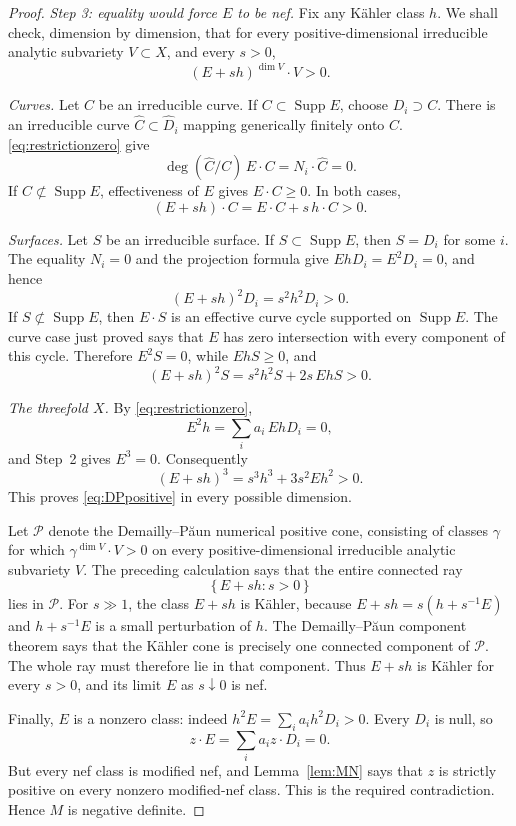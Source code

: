 \documentclass[reqno]{amsart}
\theoremstyle{remark}
\theoremstyle{plain}
\begin{document}
\begin{proof}
\smallskip
\noindent\emph{Step 3: equality would force $E$ to be nef.}
Fix any K\"ahler class $h$.  We shall check, dimension by dimension,
that for every positive-dimensional irreducible analytic subvariety
$V\subset X$, and every $s>0$,
\begin{equation}\label{eq:DPpositive}
 (E+sh)^{\dim V}\cdot V>0.
\end{equation}

\emph{Curves.}
Let $C$ be an irreducible curve.  If
$C\subset\operatorname{Supp}E$, choose $D_i\supset C$.  There is an
irreducible curve $\widehat C\subset\widehat D_i$ mapping generically
finitely onto $C$.  
\eqref{eq:restrictionzero} give
\[
 \deg(\widehat C/C)\,E\cdot C=N_i\cdot\widehat C=0.
\]
If $C\not\subset\operatorname{Supp}E$, effectiveness of $E$ gives
$E\cdot C\geq0$.  In both cases,
\[
 (E+sh)\cdot C=E\cdot C+s\,h\cdot C>0.
\]

\emph{Surfaces.}
Let $S$ be an irreducible surface.  If
$S\subset\operatorname{Supp}E$, then $S=D_i$ for some $i$.
The equality $N_i=0$ and the projection formula give
$EhD_i=E^2D_i=0$, and hence
\[
 (E+sh)^2D_i=s^2h^2D_i>0.
\]
If $S\not\subset\operatorname{Supp}E$, then $E\cdot S$ is an
effective curve cycle supported on $\operatorname{Supp}E$.  The curve
case just proved says that $E$ has zero intersection with every
component of this cycle.  Therefore
$E^2S=0$, while $EhS\geq0$, and
\[
 (E+sh)^2S=s^2h^2S+2s\,EhS>0.
\]

\emph{The threefold $X$.}
By \eqref{eq:restrictionzero},
\[
 E^2h=\sum_i a_i\,EhD_i=0,
\]
and Step~2 gives $E^3=0$.  Consequently
\[
 (E+sh)^3=s^3h^3+3s^2Eh^2>0.
\]
This proves \eqref{eq:DPpositive} in every possible dimension.

Let $\mathcal P$ denote the Demailly--P\u{a}un numerical positive
cone, consisting of classes $\gamma$ for which
$\gamma^{\dim V}\cdot V>0$ on every positive-dimensional irreducible
analytic subvariety $V$.  The preceding calculation says that the
entire connected ray
\[
 \{\,E+sh:s>0\,\}
\]
lies in $\mathcal P$.  For $s\gg1$, the class $E+sh$ is K\"ahler,
because $E+sh=s(h+s^{-1}E)$ and $h+s^{-1}E$ is a small perturbation
of $h$.  The Demailly--P\u{a}un component theorem says that the
K\"ahler cone is precisely one connected component of $\mathcal P$.
The whole ray must therefore lie in that component.  Thus $E+sh$ is
K\"ahler for every $s>0$, and its limit $E$ as $s\downarrow0$ is
nef.

Finally, $E$ is a nonzero class: indeed
$h^2E=\sum_i a_i h^2D_i>0$.  Every $D_i$ is null, so
\[
 z\cdot E=\sum_i a_i z\cdot D_i=0.
\]
But every nef class is modified nef, and Lemma~\ref{lem:MN} says that
$z$ is strictly positive on every nonzero modified-nef class.  This is
the required contradiction.  Hence $M$ is negative definite.
\end{proof}
\end{document}

